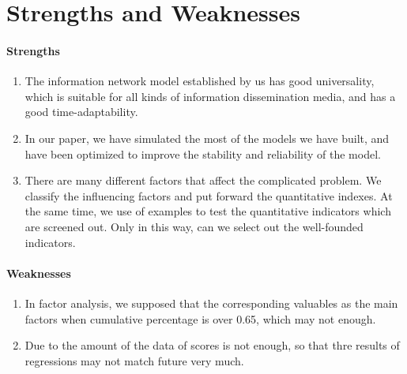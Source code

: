 \documentclass[a4paper,11pt]{article}
\begin{document}
\section{Strengths and Weaknesses}

\paragraph{Strengths}
\text{\\}
\begin{enumerate}%
\renewcommand{\labelenumi}{(\theenumi)}
    \item The information network model established by us has good universality, which is suitable for all kinds of information dissemination media, and has a good time-adaptability.
    \item In our paper, we have simulated the most of the models we have built, and have been optimized to improve the stability and reliability of the model.
    \item There are many different factors that affect the complicated problem. We classify the influencing factors and put forward the quantitative indexes. At the same time, we use of examples to test the quantitative indicators which are screened out. Only in this way, can we select out the well-founded indicators.
\end{enumerate}


\paragraph{Weaknesses}
\begin{enumerate}%
\renewcommand{\labelenumi}{(\theenumi)}
    \item In factor analysis, we supposed that the corresponding valuables as the main factors when cumulative percentage is over 0.65, which may not enough.
    \item Due to the amount of the data of scores is not enough, so that thre results of regressions may not match future very much.
\end{enumerate}
\end{document}

